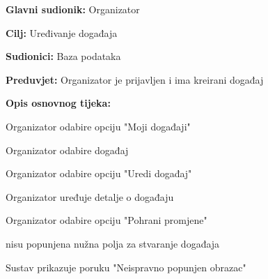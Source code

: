					\noindent {}
					\begin{packed_item}
	
						\item \textbf{Glavni sudionik:} Organizator
						\item  \textbf{Cilj:} Uređivanje događaja
						\item  \textbf{Sudionici:} Baza podataka
						\item  \textbf{Preduvjet:} Organizator je prijavljen i ima kreirani događaj

						\item  \textbf{Opis osnovnog tijeka:}
						
						\item[] \begin{packed_enum}
	
							\item Organizator odabire opciju "Moji događaji"
							\item Organizator odabire događaj
							\item Organizator odabire opciju "Uredi događaj"
							\item Organizator uređuje detalje o događaju
							\item Organizator odabire opciju "Pohrani promjene"
						\end{packed_enum}

						\item[] \begin{packed_item}
	
							\item[4.a] nisu popunjena nužna polja za stvaranje događaja
							\item[] \begin{packed_enum}
								
								\item Sustav prikazuje poruku "Neispravno popunjen obrazac"
								
							\end{packed_enum}
							
						\end{packed_item}
						
					\end{packed_item}

